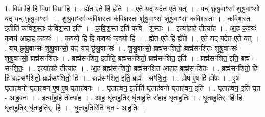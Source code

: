 \documentclass[17pt]{extarticle}
\begin{document}
1. विप्रा॒ हि हि विप्रा॒ विप्रा॒ हि । . ह्ये॑त ए॒ते हि ह्ये॑ते । . ए॒ते यद् यदे॒त ए॒ते यत् । . यच् छु॑श्रु॒वाꣳसः॑ शुश्रु॒वाꣳसो॒ यद् यच् छु॑श्रु॒वाꣳसः॑ । . शु॒श्रु॒वाꣳसः॑ कविश॒स्तः क॑विश॒स्तः शु॑श्रु॒वाꣳसः॑ शुश्रु॒वाꣳसः॑ कविश॒स्तः । . क॒वि॒श॒स्त इतीति॑ कविश॒स्तः क॑विश॒स्त इति॑ । . क॒वि॒श॒स्त इति॑ कवि - श॒स्तः । . इत्या॑हा॒हे तीत्या॑ह । . आ॒ह॒ क॒वयः॑ क॒वय॑ आहाह क॒वयः॑ । . क॒वयो॒ हि हि क॒वयः॑ क॒वयो॒ हि । . ह्ये॑त ए॒ते हि ह्ये॑ते । . ए॒ते यद् यदे॒त ए॒ते यत् । . यच् छु॑श्रु॒वाꣳसः॑ शुश्रु॒वाꣳसो॒ यद् यच् छु॑श्रु॒वाꣳसः॑ । . शु॒श्रु॒वाꣳसो॒ ब्रह्म॑सꣳशितो॒ ब्रह्म॑सꣳशितः शुश्रु॒वाꣳसः॑ शुश्रु॒वाꣳसो॒ ब्रह्म॑सꣳशितः । . ब्रह्म॑सꣳशित॒ इतीति॒ ब्रह्म॑सꣳशितो॒ ब्रह्म॑सꣳशित॒ इति॑ । . ब्रह्म॑सꣳशित॒ इति॒ ब्रह्म॑ - सꣳ॒॒शि॒तः॒ । . इत्या॑हा॒हे तीत्या॑ह । . आ॒ह॒ ब्रह्म॑सꣳशितो॒ ब्रह्म॑सꣳशित आहाह॒ ब्रह्म॑सꣳशितः । . ब्रह्म॑सꣳशितो॒ हि हि ब्रह्म॑सꣳशितो॒ ब्रह्म॑सꣳशितो॒ हि । . ब्रह्म॑सꣳशित॒ इति॒ ब्रह्म॑ - सꣳ॒॒शि॒तः॒ । . ह्ये॑ष ए॒ष हि ह्ये॑षः । . ए॒ष घृ॒ताह॑वनो घृ॒ताह॑वन ए॒ष ए॒ष घृ॒ताह॑वनः । . घृ॒ताह॑वन॒ इतीति॑ घृ॒ताह॑वनो घृ॒ताह॑वन॒ इति॑ । . घृ॒ताह॑वन॒ इति॑ घृ॒त - आ॒ह॒व॒नः॒ । . इत्या॑हा॒हे तीत्या॑ह । . आ॒ह॒ घृ॑ताहु॒तिर् घृ॑ताहु॒ति रा॑हाह घृताहु॒तिः । . घृ॒ता॒हु॒तिर्. हि हि घृ॑ताहु॒तिर् घृ॑ताहु॒तिर्. हि । . घृ॒ता॒हु॒तिरिति॑ घृत - आ॒हु॒तिः । \newline
\end{document}
